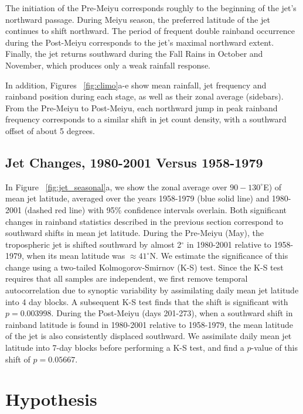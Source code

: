 	The initiation of the Pre-Meiyu corresponds roughly to the beginning of the jet's northward passage. During Meiyu season, the preferred latitude of the jet continues to shift northward. The period of frequent double rainband occurrence during the Post-Meiyu corresponds to the jet's maximal northward extent. Finally, the jet returns southward during the Fall Rains in October and November, which produces only a weak rainfall response.
	
	In addition, Figures ~\ref{fig:climo}a-e show mean rainfall, jet frequency and rainband position during each stage, as well as their zonal average (sidebars). From the Pre-Meiyu to Post-Meiyu, each northward jump in peak rainband frequency corresponds to a similar shift in jet count density, with a southward offset of about 5 degrees.
	
\subsection{Jet Changes, 1980-2001 Versus 1958-1979}

	In Figure ~\ref{fig:jet_seasonal}a, we show the zonal average over $90-130^\circ$E) of mean jet latitude, averaged over the years 1958-1979 (blue solid line) and 1980-2001 (dashed red line) with 95\% confidence intervals overlain. Both significant changes in rainband statistics described in the previous section correspond to southward shifts in mean jet latitude. During the Pre-Meiyu (May), the tropospheric jet is shifted southward by almost 2$^{\circ}$ in 1980-2001 relative to 1958-1979, when its mean latitude was $\approx 41^{\circ}$N. We estimate the significance of this change using a two-tailed Kolmogorov-Smirnov (K-S) test. Since the K-S test requires that all samples are independent, we first remove temporal autocorrelation due to synoptic variability by assimilating daily mean jet latitude into 4 day blocks. A subsequent K-S test finds that the shift is significant with $p=0.003998$. During the Post-Meiyu (days 201-273), when a southward shift in rainband latitude is found in 1980-2001 relative to 1958-1979, the mean latitude of the jet is also consistently displaced southward. We assimilate daily mean jet latitude into 7-day blocks before performing a K-S test, and find a $p$-value of this shift of $p=0.05667$.
	
\section{Hypothesis}


